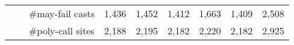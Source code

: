 \begin{table}[]
\begin{tabular}{@{}r|clrrrrrr@{}}
                                   &                           & \#may-fail casts     & 1,436                    & 1,452                      & 1,412                           & 1,663                         & 1,409                    & 2,508                         \\
                                   &                           & \#poly-call sites    & 2,188                    & 2,195                      & 2,182                           & 2,220                         & 2,182                         & 2,925                      \\
\bottomrule
\end{tabular}
\end{table} 
